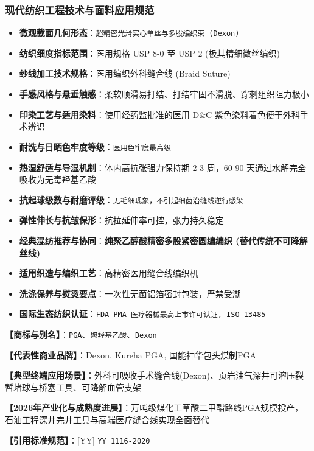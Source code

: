 \documentclass[11pt,openright,twoside,UTF8]{ctexbook}
\begin{document}
\subsubsection*{现代纺织工程技术与面料应用规范}
\begin{itemize} \setlength{\itemsep}{2pt}
    \item \textbf{微观截面几何形态}：\texttt{超精密光滑实心单丝与多股编织束 (Dexon)}
    \item \textbf{纺织细度指标范围}：医用规格 USP 8-0 至 USP 2 (极其精细微丝编织)
    \item \textbf{纱线加工技术规格}：医用编织外科缝合线 (Braid Suture)
    \item \textbf{手感风格与悬垂触感}：柔软顺滑易打结、打结牢固不滑脱、穿刺组织阻力极小
    \item \textbf{印染工艺与适用染料}：使用经药监批准的医用 D\&C 紫色染料着色便于外科手术辨识
    \item \textbf{耐洗与日晒色牢度等级}：\texttt{医用色牢度最高级}
    \item \textbf{热湿舒适与导湿机制}：体内高抗张强力保持期 2-3 周，60-90 天通过水解完全吸收为无毒羟基乙酸
    \item \textbf{抗起球级数与耐磨评级}：\texttt{无毛细现象，不引起细菌沿缝线逆行感染}
    \item \textbf{弹性伸长与抗皱保形}：抗拉延伸率可控，张力持久稳定
    \item \textbf{经典混纺推荐与协同}：\textbf{纯聚乙醇酸精密多股紧密圆编编织 (替代传统不可降解丝线)}
    \item \textbf{适用织造与编织工艺}：高精密医用缝合线编织机
    \item \textbf{洗涤保养与熨烫要点}：一次性无菌铝箔密封包装，严禁受潮
    \item \textbf{国际生态纺织认证}：\texttt{FDA PMA 医疗器械最高上市许可认证, ISO 13485}
\end{itemize}
\vspace{0.2cm}

\noindent\textbf{【商标与别名】}：\texttt{PGA}、\texttt{聚羟基乙酸}、\texttt{Dexon}\par
\noindent\textbf{【代表性商业品牌】}：Dexon, Kureha PGA, 国能神华包头煤制PGA\par
\noindent\textbf{【典型终端应用场景】}：外科可吸收手术缝合线(Dexon)、页岩油气深井可溶压裂暂堵球与桥塞工具、可降解血管支架\par
\noindent\textbf{【2026年产业化与成熟度进展】}：万吨级煤化工草酸二甲酯路线PGA规模投产，石油工程深井完井工具与高端医疗缝合线实现全面替代\par
\noindent\textbf{【引用标准规范】}：[YY] \texttt{YY 1116-2020}\par
\vspace{0.5cm}
\end{document}
